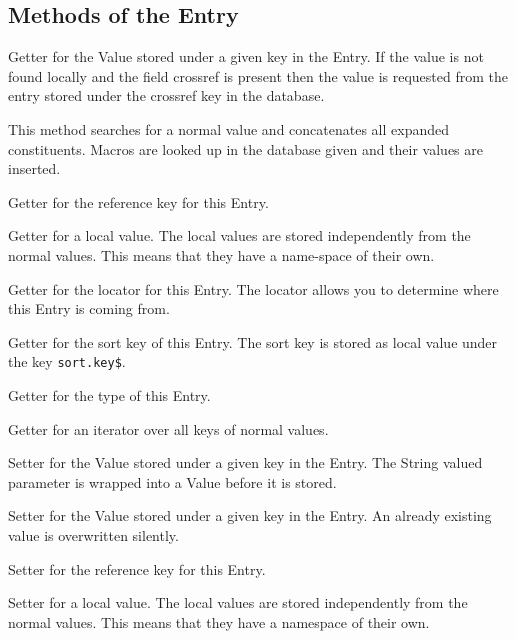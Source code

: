 \subsection{Methods of the Entry}

\begin{methods}
    Getter for the Value stored under a given key in the Entry. If the
    value is not found locally and the field crossref is present then
    the value is requested from the entry stored under the crossref key
    in the database.

    This method searches for a normal value and concatenates all
    expanded constituents. Macros are looked up in the database given and
    their values are inserted.

    Getter for the reference key for this Entry.

    Getter for a local value. The local values are stored independently from
    the normal values. This means that they have a name-space of their own.

    Getter for the locator for this Entry. The locator allows you to
    determine where this Entry is coming from.

    Getter for the sort key of this Entry. The sort key is stored as local
    value under the key \texttt{sort.key\$}.

    Getter for the type of this Entry.

    Getter for an iterator over all keys of normal values.

    Setter for the Value stored under a given key in the Entry. The String
    valued parameter is wrapped into a  Value before it is stored.

    Setter for the Value stored under a given key in the Entry. An already
    existing value is overwritten silently.

    Setter for the reference key for this Entry.

     Setter for a local value. The local values are stored independently from
     the normal values. This means that they have a namespace of their own.


\end{methods}
